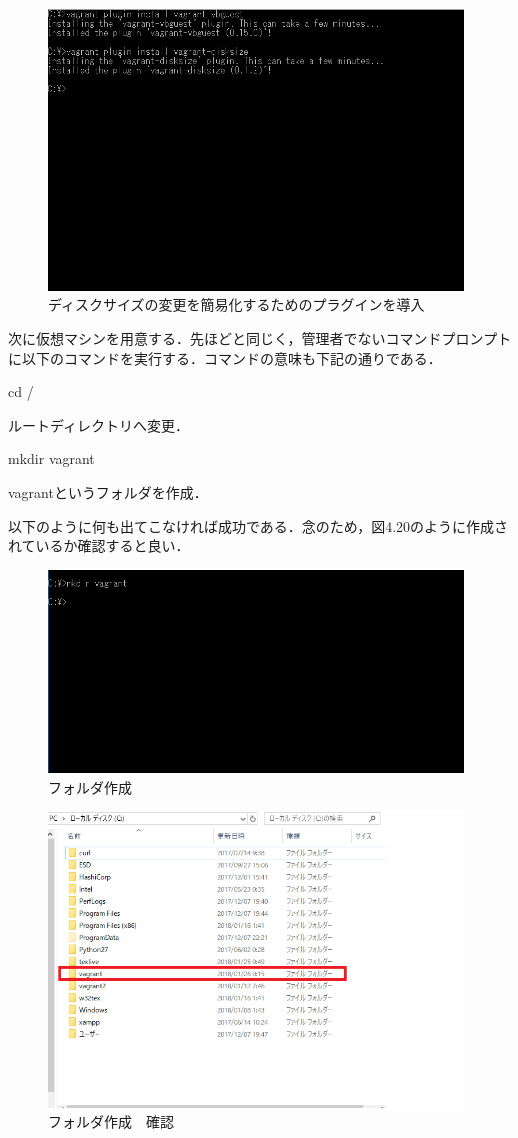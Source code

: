 \begin{figure}[htb]
\centering
\includegraphics[width=11cm]{4-18.png}
\caption{ディスクサイズの変更を簡易化するためのプラグインを導入}\label{4-18}
\end{figure}
\newpage

次に仮想マシンを用意する．先ほどと同じく，管理者でないコマンドプロンプトに以下のコマンドを実行する．コマンドの意味も下記の通りである．

cd /

ルートディレクトリへ変更．

mkdir vagrant

vagrantというフォルダを作成．

以下のように何も出てこなければ成功である．念のため，図4.20のように作成されているか確認すると良い．

\begin{figure}[htb]
\centering
\includegraphics[width=11cm]{4-19.png}
\caption{フォルダ作成}\label{4-19}
\end{figure}

\begin{figure}[htb]
\centering
\includegraphics[width=11cm]{4-20.png}
\caption{フォルダ作成　確認}\label{4-20}
\end{figure}
\newpage

